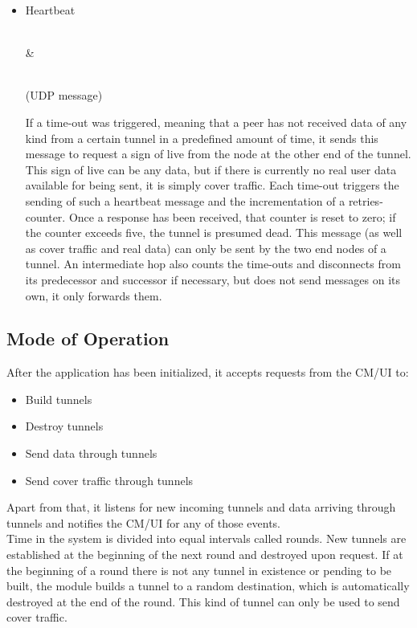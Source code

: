 \documentclass{article}
\begin{document}
\begin{itemize}
		Contains cover traffic of a specified size, which was requested to be sent by the local CM/UI module. Since it contains no meaningful data, the message is discarded upon reception.
		
	\item Heartbeat \\[8pt]
		\begin{bytefield}[bitwidth=1.0em]{32}
			 \\
			& 
		\end{bytefield} \\
		(UDP message)

		If a time-out was triggered, meaning that a peer has not received data of any kind from a certain tunnel in a predefined amount of time, it sends this message to request a sign of live from the node at the other end of the tunnel. This sign of live can be any data, but if there is currently no real user data available for being sent, it is simply cover traffic.
		Each time-out triggers the sending of such a heartbeat message and the incrementation of a retries-counter. Once a response has been received, that counter is reset to zero; if the counter exceeds five, the tunnel is presumed dead. This message (as well as cover traffic and real data) can only be sent by the two end nodes of a tunnel. An intermediate hop also counts the time-outs and disconnects from its predecessor and successor if necessary, but does not send messages on its own, it only forwards them.
\end{itemize}
	
	\subsection{Mode of Operation}
	After the application has been initialized, it accepts requests from the CM/UI to:
	\begin{itemize}
		\item Build tunnels
		\item Destroy tunnels
		\item Send data through tunnels
		\item Send cover traffic through tunnels
	\end{itemize}
	Apart from that, it listens for new incoming tunnels and data arriving through tunnels and notifies the CM/UI for any of those events. \\
	Time in the system is divided into equal intervals called rounds. New tunnels are established at the beginning of the next round and destroyed upon request. If at the beginning of a round there is not any tunnel in existence or pending to be built, the module builds a tunnel to a random destination, which is automatically destroyed at the end of the round. This kind of tunnel can only be used to send cover traffic.
	
\end{document}
